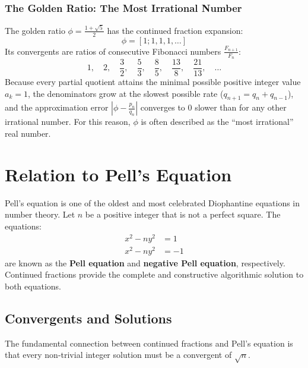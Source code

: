 \documentclass[a4paper]{article}
\begin{document}
\subsubsection{The Golden Ratio: The Most Irrational Number}
The golden ratio $\phi = \frac{1+\sqrt{5}}{2}$ has the continued fraction expansion:
\[
  \phi = [1; 1, 1, 1, \dots]
\]
Its convergents are ratios of consecutive Fibonacci numbers $\frac{F_{n+1}}{F_n}$:
\[
  1, \quad 2, \quad \frac{3}{2}, \quad \frac{5}{3}, \quad \frac{8}{5}, \quad \frac{13}{8}, \quad \frac{21}{13}, \quad \dots
\]
Because every partial quotient attains the minimal possible positive integer value $a_k = 1$, the denominators grow at the slowest possible rate ($q_{n+1} = q_n + q_{n-1}$), and the approximation error $\left|\phi - \frac{p_n}{q_n}\right|$ converges to $0$ slower than for any other irrational number.
For this reason, $\phi$ is often described as the ``most irrational'' real number.


\section{Relation to Pell's Equation}\label{cf:sec:relation-to-pell's-equation}
Pell's equation is one of the oldest and most celebrated Diophantine equations in number theory.
Let $n$ be a positive integer that is not a perfect square.
The equations:
\begin{align}
  x^2 - n y^2 & = 1 \label{cf:eq:pell-pos} \\
  x^2 - n y^2 & = -1 \label{cf:eq:pell-neg}
\end{align}
are known as the \textbf{Pell equation} and \textbf{negative Pell equation}, respectively.
Continued fractions provide the complete and constructive algorithmic solution to both equations.

\subsection{Convergents and Solutions}
The fundamental connection between continued fractions and Pell's equation is that every non-trivial integer solution must be a convergent of $\sqrt{n}$.
\end{document}
